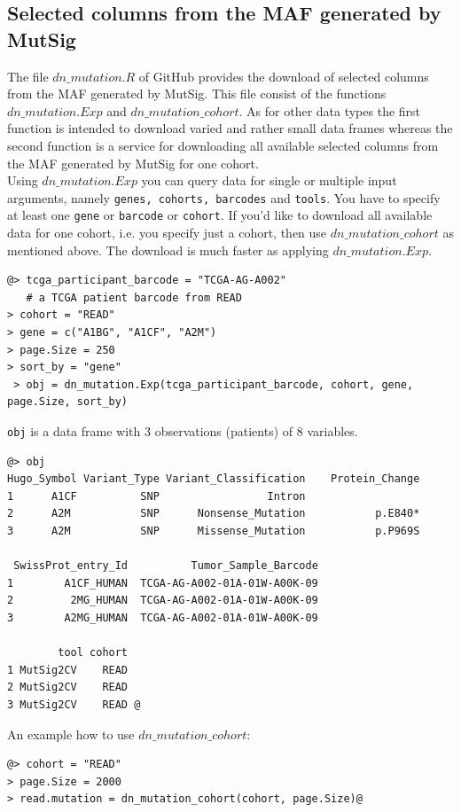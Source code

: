 \documentclass[a4paper,12pt,listof=totoc,bibliography=totoc]{scrartcl}
\begin{document}
\subsection{Selected columns from the MAF generated by MutSig}
The file $dn\_mutation.R$ of GitHub provides the download of selected columns from the MAF generated by MutSig. This file consist of the functions 
$dn\_mutation.Exp$ and $dn\_mutation\_cohort$. As for other data types the first function is intended to download varied and rather small data frames 
whereas the second function is a service for downloading all available selected columns from the MAF generated by MutSig for one cohort.\\
Using $dn\_mutation.Exp$ you can query data for single or multiple input arguments, namely {\tt genes, cohorts, barcodes} and {\tt tools}. You 
have to specify at least one {\tt gene} or {\tt barcode} or {\tt cohort}. If you'd like to download all available data for one 
cohort, i.e. you specify just a cohort, then use $dn\_mutation\_cohort$ as mentioned above. The download is much faster as applying 
$dn\_mutation.Exp$.
\begin{lstlisting}[style=base]
@> tcga_participant_barcode = "TCGA-AG-A002"
   # a TCGA patient barcode from READ
> cohort = "READ"
> gene = c("A1BG", "A1CF", "A2M")
> page.Size = 250
> sort_by = "gene"
 > obj = dn_mutation.Exp(tcga_participant_barcode, cohort, gene, 
page.Size, sort_by)
\end{lstlisting}
{\tt obj} is a data frame with 3 observations (patients) of 8 variables.
\begin{lstlisting}[style=base]
@> obj
Hugo_Symbol Variant_Type Variant_Classification    Protein_Change 
1      A1CF          SNP                 Intron                        
2      A2M           SNP      Nonsense_Mutation           p.E840*         
3      A2M           SNP      Missense_Mutation           p.P969S   

 SwissProt_entry_Id          Tumor_Sample_Barcode       
1        A1CF_HUMAN  TCGA-AG-A002-01A-01W-A00K-09  
2         2MG_HUMAN  TCGA-AG-A002-01A-01W-A00K-09  
3        A2MG_HUMAN  TCGA-AG-A002-01A-01W-A00K-09  

        tool cohort
1 MutSig2CV    READ
2 MutSig2CV    READ
3 MutSig2CV    READ @
\end{lstlisting}
An example how to use $dn\_mutation\_cohort$:
\begin{lstlisting}[style=base]
@> cohort = "READ"
> page.Size = 2000
> read.mutation = dn_mutation_cohort(cohort, page.Size)@
\end{lstlisting}
\end{document}
